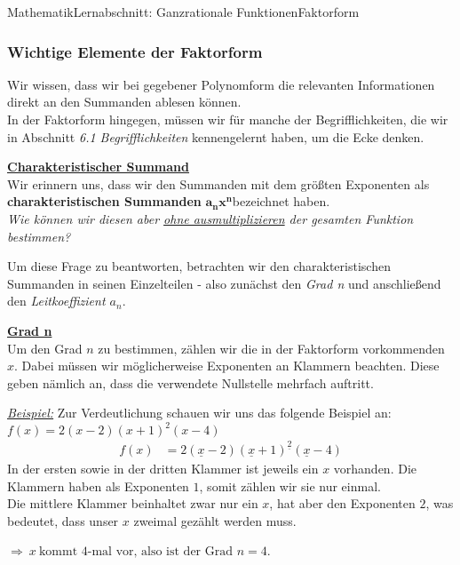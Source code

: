 \documentclass[11pt,twocolumn,oneside,openany,headings=optiontotoc,11pt,numbers=noenddot]{article}
\begin{document}
\begin{worksheet}{Mathematik}{Lernabschnitt: Ganzrationale Funktionen}{Faktorform}
		\subsubsection{Wichtige Elemente der Faktorform}
		Wir wissen, dass wir bei gegebener Polynomform die relevanten Informationen direkt an den Summanden ablesen können.\\
		In der Faktorform hingegen, müssen wir für manche der Begrifflichkeiten, die wir in Abschnitt \textit{6.1 Begrifflichkeiten} kennengelernt haben, um die Ecke denken.\\
		\par\noindent
		\underline{\textbf{Charakteristischer Summand}}\\
		Wir erinnern uns, dass wir den Summanden mit dem größten Exponenten als \textbf{charakteristischen Summanden} \(\mathbf{a_nx^n}\)bezeichnet haben.\\
		\textit{Wie können wir diesen aber \underline{ohne ausmultiplizieren} der gesamten Funktion bestimmen?}\\
		\par\noindent
		Um diese Frage zu beantworten, betrachten wir den charakteristischen Summanden in seinen Einzelteilen - also zunächst den \textit{Grad n} und anschließend den \textit{Leitkoeffizient \(a_n\)}.\\
		\par\noindent
		\underline{\textbf{Grad n}}\\
		Um den Grad \(n\) zu bestimmen, zählen wir die in der Faktorform vorkommenden \(x\). Dabei müssen wir möglicherweise Exponenten an Klammern beachten. Diese geben nämlich an, dass die verwendete Nullstelle mehrfach auftritt.\\
		\par\noindent
		\textit{\underline{Beispiel:}} Zur Verdeutlichung schauen wir uns das folgende Beispiel an: \(f(x) = 2(x-2)(x+1)^2(x-4)\)
		\begin{align*}
			f(x) & = 2(\underline{x}-2)(\underline{x}+1)^{\underline{2}}(\underline{x}-4)	
		\end{align*}
		In der ersten sowie in der dritten Klammer ist jeweils ein \(x\) vorhanden. Die Klammern haben als Exponenten \(1\), somit zählen wir sie nur einmal.\\
		Die mittlere Klammer beinhaltet zwar nur ein \(x\), hat aber den Exponenten \(2\), was bedeutet, dass unser \(x\) zweimal gezählt werden muss.\\
		\par\noindent
		\(\Rightarrow\ x\ \text{kommt\ } 4\text{-mal\ vor,\ also\ ist\ der\ Grad}\) \colorbox{green!10}{\(n = 4\)}.\\

\end{worksheet}
\end{document}
